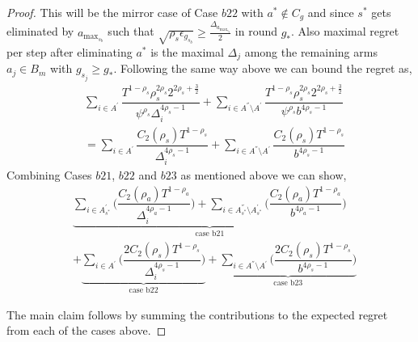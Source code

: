 \begin{proof}
This will be the mirror case of Case $b22$ with $a^{*}\notin C_{g}$ and since $s^{*}$ gets eliminated by $a_{\max_{s_{b}}}$ such that $\sqrt{\rho_{s}\epsilon_{g_{s_{b}}}}\geq\frac{\Delta_{a_{\max_{s_{b}}}}}{2}$ in round $g_{*}$. Also maximal regret per step after eliminating $a^{*}$ is the maximal $\Delta_{j}$ among the remaining arms $a_{j}\in B_{m}$ with $g_{s_{j}}\geq g_{*}$. Following the same way above we can bound the regret as,
\begin{align*}
&\sum_{i\in A^{'}}\dfrac{T^{1-\rho_{s}}\rho_{s}^{2\rho_{s}}2^{2\rho_{s}+\frac{3}{2}}}{\psi^{\rho_{s}}\Delta_{i}^{4\rho_{s}-1}} +\sum_{i\in A^{''}\setminus A^{'}}\dfrac{T^{1-\rho_{s}}\rho_{s}^{2\rho_{s}}2^{2\rho_{s}+\frac{3}{2}}}{\psi^{\rho_{s}}b^{4\rho_{s}-1}} \\
& = \sum_{i\in A^{'}}\dfrac{C_{2}(\rho_{s})T^{1-\rho_{s}}}{\Delta_{i}^{4\rho_{s}-1}} +\sum_{i\in A^{''}\setminus A^{'}}\dfrac{C_{2}(\rho_{s})T^{1-\rho_{s}}}{b^{4\rho_{s}-1}}
\end{align*}
\newline
Combining Cases $b21$, $b22$ and $b23$ as mentioned above we can show,
 \begin{align*}
 &\underbrace{\sum_{i\in A^{'}_{s^{*}}}\bigg(\dfrac{C_{2}(\rho_{a})T^{1-\rho_{a}}}{\Delta_{i}^{4\rho_{a} -1}} \bigg)+\sum_{i\in A^{''}_{s^{*}}\setminus A^{'}_{s^{*}}}\bigg(\dfrac{C_{2}(\rho_{a})T^{1-\rho_{a}}}{b^{4\rho_{a} -1}} \bigg)}_{\text{case b21}} \\
 & + \underbrace{\sum_{i\in A^{'}}\bigg(\dfrac{2C_{2}(\rho_{s})T^{1-\rho_{s}}}{\Delta_{i}^{4\rho_{s}-1}} \bigg)}_{\text{case b22}}+\underbrace{\sum_{i\in A^{''}\setminus A^{'}}\bigg(\dfrac{2C_{2}(\rho_{s})T^{1-\rho_{s}}}{b^{4\rho_{s} -1}} \bigg)}_{\text{case b23}}
 \end{align*}
 

The main claim follows by summing the contributions to the expected regret from each of the cases above.

\end{proof}


